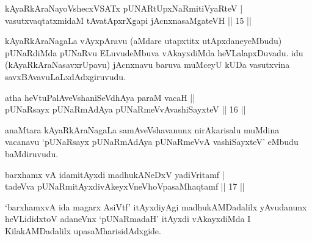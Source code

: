 
\begin{shl}
\footnotemark{}kAyaRkAraNayoVshecxVSATx pUNARtUpxNaRmitiVyaRteV  | \\
vasutxvaqtatxmidaM tAvatApxrXgapi jAcnxnasaMgateVH \hfill ||  15 ||  
\end{shl}

\begin{artha}
kAyaRkAraNagaLa vAyxpAravu (aMdare utapxtitx utApxdaneyeMbudu) pUNaRdiMda pUNaRvu ELuvudeMbuva vAkayxdiMda heVLalapxDuvadu. idu (kAyaRkAraNasavxrUpavu) jAcnxnavu baruva muMceyU kUDa vasutxvina savxBAvavuLaLxdAdxgiruvudu.
\end{artha}


\begin{shl}
atha heVtuPalAveVshaniSeVdhAya paraM vacaH ||  \\
pUNaRsayx pUNaRmAdAya pUNaRmeVvAvashiSayxteV \hfill||  16 ||  
\end{shl}

\begin{artha}
anaMtara kAyaRkAraNagaLa samAveVshavanunx nirAkarisalu muMdina vacanavu `pUNaRsayx pUNaRmAdAya pUNaRmeVvA vashiSayxteV' eMbudu baMdiruvudu.
\end{artha}

\begin{shl}
barxhamx vA idamitAyxdi madhukANeDxV yadiVritamf  | \\
tadeVva pUNaRmitAyxdivAkeyxVneVhoVpasaMhaqtamf \hfill ||  17 ||  
\end{shl}

\begin{artha}
`barxhamxvA ida magarx AsiVtf' itAyxdiyAgi madhukAMDadalilx yAvudanunx heVLididxtoV adaneVnx `pUNaRmadaH' itAyxdi vAkayxdiMda I KilakAMDadalilx upasaMharisidAdxgide.
\end{artha}

